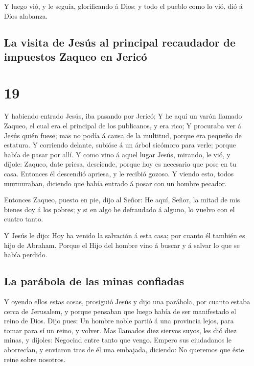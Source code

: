  Y luego vió, y le seguía, glorificando á Dios: y todo el
pueblo como lo vió, dió á Dios alabanza.

\hypertarget{la-visita-de-jesuxfas-al-principal-recaudador-de-impuestos-zaqueo-en-jericuxf3}{%
\subsection{La visita de Jesús al principal recaudador de impuestos
Zaqueo en
Jericó}\label{la-visita-de-jesuxfas-al-principal-recaudador-de-impuestos-zaqueo-en-jericuxf3}}

\hypertarget{section-18}{%
\section{19}\label{section-18}}

 Y habiendo entrado Jesús, iba pasando por Jericó;
 Y he aquí un varón llamado Zaqueo, el cual era el
principal de los publicanos, y era rico;  Y procuraba ver
á Jesús quién fuese; mas no podía á causa de la multitud, porque era
pequeño de estatura.  Y corriendo delante, subióse á un
árbol sicómoro para verle; porque había de pasar por allí.
 Y como vino á aquel lugar Jesús, mirando, le vió, y
díjole: Zaqueo, date priesa, desciende, porque hoy es necesario que pose
en tu casa.  Entonces él descendió apriesa, y le recibió
gozoso.  Y viendo esto, todos murmuraban, diciendo que
había entrado á posar con un hombre pecador.

 Entonces Zaqueo, puesto en pie, dijo al Señor: He aquí,
Señor, la mitad de mis bienes doy á los pobres; y si en algo he
defraudado á alguno, lo vuelvo con el cuatro tanto.

 Y Jesús le dijo: Hoy ha venido la salvación á esta casa;
por cuanto él también es hijo de Abraham.  Porque el Hijo
del hombre vino á buscar y á salvar lo que se había perdido.

\hypertarget{la-paruxe1bola-de-las-minas-confiadas}{%
\subsection{La parábola de las minas
confiadas}\label{la-paruxe1bola-de-las-minas-confiadas}}

 Y oyendo ellos estas cosas, prosiguió Jesús y dijo una
parábola, por cuanto estaba cerca de Jerusalem, y porque pensaban que
luego había de ser manifestado el reino de Dios.  Dijo
pues: Un hombre noble partió á una provincia lejos, para tomar para sí
un reino, y volver.  Mas llamados diez siervos suyos, les
dió diez minas, y díjoles: Negociad entre tanto que vengo.
 Empero sus ciudadanos le aborrecían, y enviaron tras de
él una embajada, diciendo: No queremos que éste reine sobre nosotros.

